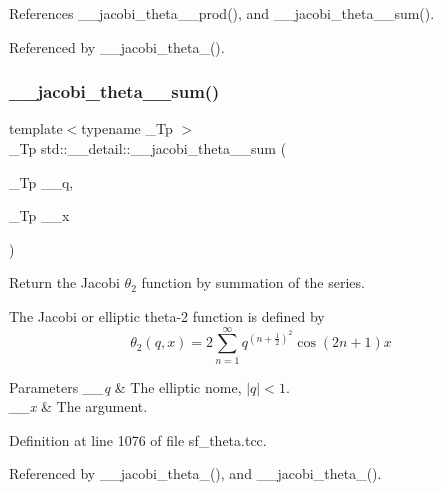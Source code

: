References \+\_\+\+\_\+jacobi\+\_\+theta\+\_\+\_\+prod(), and \+\_\+\+\_\+jacobi\+\_\+theta\+\_\+\_\+sum().



Referenced by \+\_\+\+\_\+jacobi\+\_\+theta\+\_().

\mbox{\label{namespacestd_1_1____detail_a6eba88f5f854974b7fe7445e9b11a0e0}} 
\subsubsection{\texorpdfstring{\+\_\+\+\_\+jacobi\+\_\+theta\+\_\+\_\+sum()}{\_\_jacobi\_theta\_2\_sum()}}
{\footnotesize\ttfamily template$<$typename \+\_\+\+Tp $>$ \\
\+\_\+\+Tp std\+::\+\_\+\+\_\+detail\+::\+\_\+\+\_\+jacobi\+\_\+theta\+\_\+\_\+sum (\begin{DoxyParamCaption}\item[{\+\_\+\+Tp}]{\+\_\+\+\_\+q,  }\item[{\+\_\+\+Tp}]{\+\_\+\+\_\+x }\end{DoxyParamCaption})}

Return the Jacobi $ \theta_2 $ function by summation of the series.

The Jacobi or elliptic theta-\/2 function is defined by \[ \theta_2(q,x) = 2\sum_{n=1}^{\infty} q^{(n+\frac{1}{2})^2}\cos{(2n+1)x} \]


\begin{DoxyParams}{Parameters}
{\em \+\_\+\+\_\+q} & The elliptic nome, $ |q| < 1 $. \\
\hline
{\em \+\_\+\+\_\+x} & The argument. \\
\hline
\end{DoxyParams}


Definition at line 1076 of file sf\+\_\+theta.\+tcc.



Referenced by \+\_\+\+\_\+jacobi\+\_\+theta\+\_(), and \+\_\+\+\_\+jacobi\+\_\+theta\+\_().

\mbox{\label{namespacestd_1_1____detail_ac7a6c396a102438d2c104f344b4f6a72}} 
